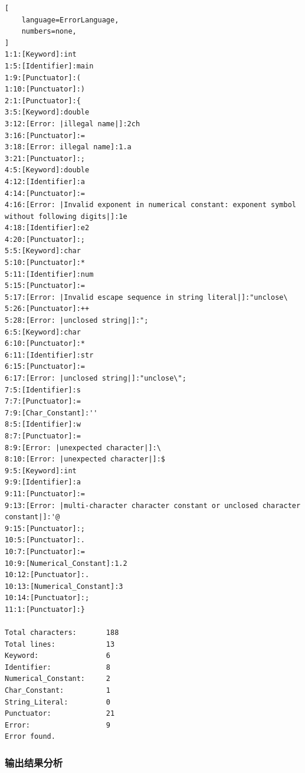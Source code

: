 \documentclass[lang=cn,11pt,a4paper]{elegantpaper}
\begin{document}
\begin{lstlisting}[
    language=ErrorLanguage,
    numbers=none,
]
1:1:[Keyword]:int
1:5:[Identifier]:main
1:9:[Punctuator]:(
1:10:[Punctuator]:)
2:1:[Punctuator]:{
3:5:[Keyword]:double
3:12:[Error: |illegal name|]:2ch
3:16:[Punctuator]:=
3:18:[Error: illegal name]:1.a
3:21:[Punctuator]:;
4:5:[Keyword]:double
4:12:[Identifier]:a
4:14:[Punctuator]:=
4:16:[Error: |Invalid exponent in numerical constant: exponent symbol without following digits|]:1e
4:18:[Identifier]:e2
4:20:[Punctuator]:;
5:5:[Keyword]:char
5:10:[Punctuator]:*
5:11:[Identifier]:num
5:15:[Punctuator]:=
5:17:[Error: |Invalid escape sequence in string literal|]:"unclose\
5:26:[Punctuator]:++
5:28:[Error: |unclosed string|]:";
6:5:[Keyword]:char
6:10:[Punctuator]:*
6:11:[Identifier]:str
6:15:[Punctuator]:=
6:17:[Error: |unclosed string|]:"unclose\";
7:5:[Identifier]:s
7:7:[Punctuator]:=
7:9:[Char_Constant]:''
8:5:[Identifier]:w
8:7:[Punctuator]:=
8:9:[Error: |unexpected character|]:\
8:10:[Error: |unexpected character|]:$
9:5:[Keyword]:int
9:9:[Identifier]:a
9:11:[Punctuator]:=
9:13:[Error: |multi-character character constant or unclosed character constant|]:'@
9:15:[Punctuator]:;
10:5:[Punctuator]:.
10:7:[Punctuator]:=
10:9:[Numerical_Constant]:1.2
10:12:[Punctuator]:.
10:13:[Numerical_Constant]:3
10:14:[Punctuator]:;
11:1:[Punctuator]:}

Total characters:       188
Total lines:            13
Keyword:                6
Identifier:             8
Numerical_Constant:     2
Char_Constant:          1
String_Literal:         0
Punctuator:             21
Error:                  9
Error found.
\end{lstlisting}

\subsubsection{输出结果分析}
\end{document}
